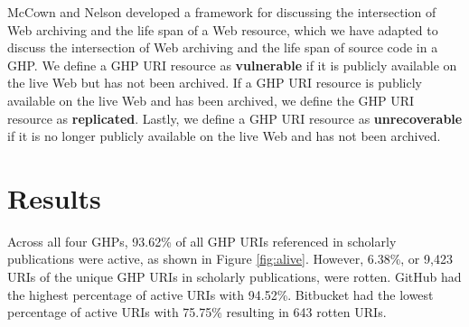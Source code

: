 
McCown and Nelson \cite{mccown-jcdl2009} developed a framework for discussing the intersection of Web archiving and the life span of a Web resource, which we have adapted to discuss the intersection of Web archiving and the life span of source code in a GHP. We define a GHP URI resource as \textbf{vulnerable} if it is publicly available on the live Web but has not been archived. If a GHP URI resource is publicly available on the live Web and has been archived, we define the GHP URI resource as \textbf{replicated}. Lastly, we define a GHP URI resource as \textbf{unrecoverable} if it is no longer publicly available on the live Web and has not been archived. 

\section{Results}
Across all four GHPs, 93.62\% of all GHP URIs referenced in scholarly publications were active, as shown in Figure \ref{fig:alive}. However, 6.38\%, or 9,423 URIs of the unique GHP URIs in scholarly publications, were rotten. GitHub had the highest percentage of active URIs with 94.52\%. Bitbucket had the lowest percentage of active URIs with 75.75\% resulting in 643 rotten URIs. 

